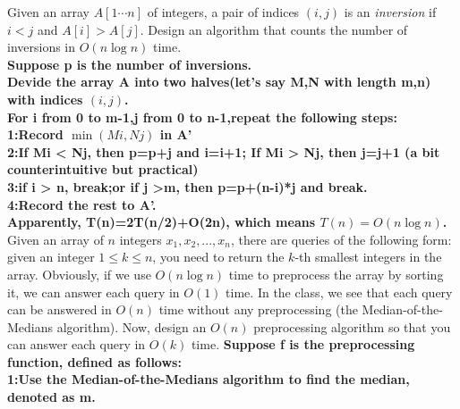 \documentclass{oxmathproblems}
\begin{document}
\begin{questions}

\miquestion[25]
Given an array $A[1\cdots n]$ of integers, a pair of indices $(i,j)$ is an \emph{inversion} if $i<j$ and $A[i]>A[j]$.
Design an algorithm that counts the number of inversions in $O(n\log n)$ time.\\
\textbf{Suppose p is the number of inversions.\\
    Devide the array A into two halves(let's say M,N with length m,n) with indices $(i,j)$.\\
    For i from 0 to m-1,j from 0 to n-1,repeat the following steps:\\
    1:Record $\min(Mi,Nj)$ in A'\\
    2:If Mi < Nj, then p=p+j and i=i+1; If Mi > Nj, then j=j+1 (a bit counterintuitive but practical)\\
    3:if i > n, break;or if j >m, then p=p+(n-i)*j and break.\\
    4:Record the rest to A'.\\
    Apparently, T(n)=2T(n/2)+O(2n), which means $T(n)=O(n\log n)$.}\\
\miquestion[25]
Given an array of $n$ integers $x_1,x_2,...,x_n$, there are queries of the following form: given an integer $1\leq k\leq n$, you need to return the $k$-th smallest integers in the array. Obviously, if we use $O(n\log n)$ time to preprocess the array by sorting it, we can answer each query in $O(1)$ time. In the class, we see that each query can be answered in $O(n)$ time without any preprocessing (the Median-of-the-Medians algorithm). Now, design an $O(n)$ preprocessing algorithm so that you can answer each query in $O(k)$ time. 
\textbf{Suppose f is the preprocessing function, defined as follows:\\
        1:Use the Median-of-the-Medians algorithm to find the median, denoted as m.\\
}
\end{questions}
\end{document}
